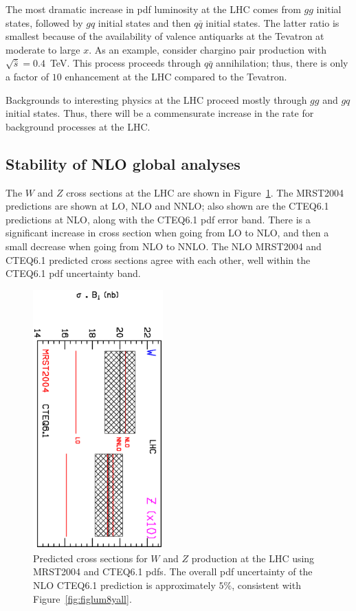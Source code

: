 \documentclass[12pt]{iopart}
\begin{document}
%
The most dramatic increase in pdf luminosity at the LHC comes from  $gg$ initial states, followed by $gq$ initial states and
then $q\bar{q}$ initial states. The latter ratio is smallest because of the availability of valence antiquarks at the
Tevatron at moderate to large $x$. As an example, consider chargino pair production with $\sqrt{\hat{s}}=0.4$~TeV. This
process proceeds through $q\bar{q}$ annihilation; thus, there is only a factor of $10$ enhancement at the LHC compared to the
Tevatron. 

Backgrounds to interesting physics at the LHC proceed mostly through $gg$ and $gq$ initial states. Thus, there
will be a commensurate increase in the rate for background processes at the LHC. 


\subsection{Stability of NLO global analyses}
\label{sec:stable}

The $W$ and $Z$ cross sections at the LHC are shown in Figure~\ref{fig:LHC_WZ}. The MRST2004 predictions are shown
at LO, NLO and NNLO; also shown are the CTEQ6.1 predictions at NLO, along with the CTEQ6.1 pdf error band. There
is a significant increase in cross section when going from LO to NLO, and then a small decrease when going from
NLO to NNLO. The NLO MRST2004 and CTEQ6.1 predicted cross sections agree with each other, well within the
CTEQ6.1 pdf uncertainty band. 
%
\begin{figure}[t]
\begin{center}
\includegraphics[width=5cm,angle=90]{dyxsec_lhc.ps}
\end{center}
\caption{Predicted cross sections for $W$ and $Z$ production at the LHC using MRST2004 and CTEQ6.1 pdfs. The
overall pdf uncertainty of the NLO CTEQ6.1 prediction is approximately $5\%$,
consistent with Figure~\ref{fig:figlum8yall}.
}
\label{fig:LHC_WZ}
\end{figure}
\end{document}
